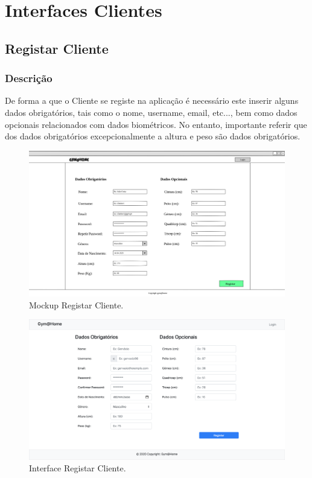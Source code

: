 
\section{Interfaces Clientes}
\label{sec:mockupsclients}

\subsection{Registar Cliente}
\label{subsec:registarcliente}

\subsubsection{Descrição}

\hspace{5mm} De forma a que o Cliente se registe na aplicação é necessário este inserir alguns dados obrigatórios, tais como o nome, username, email, etc..., bem como dados opcionais relacionados com dados biométricos. No entanto, importante referir que dos dados obrigatórios excepcionalmente a altura e peso são dados obrigatórios.

\begin{figure}[H]
    \centering
    \includegraphics[scale=0.25]{images/mockups/cliente_registo_.png}
    \caption{Mockup Registar Cliente.}
    \label{fig:mockupregistarcliente}
\end{figure}

\begin{figure}[H]
    \centering
    \includegraphics[scale=0.25]{images/interfaces/client_register.png}
    \caption{Interface Registar Cliente.}
    \label{fig:interfaceregistarcliente}
\end{figure}

